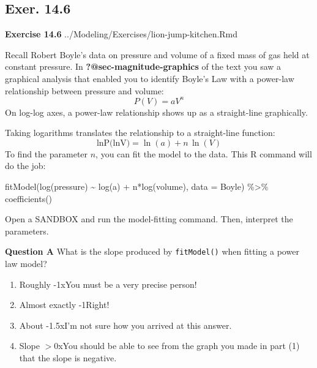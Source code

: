 \documentclass[
  letterpaper,
  DIV=11,
  numbers=noendperiod,
  oneside]{article}
\newenvironment{Shaded}{\begin{snugshade}}{\end{snugshade}}
\newcommand{\AttributeTok}[1]{\textcolor[rgb]{0.40,0.45,0.13}{#1}}
\newcommand{\FunctionTok}[1]{\textcolor[rgb]{0.28,0.35,0.67}{#1}}
\newcommand{\NormalTok}[1]{\textcolor[rgb]{0.00,0.23,0.31}{#1}}
\newcommand{\SpecialCharTok}[1]{\textcolor[rgb]{0.37,0.37,0.37}{#1}}
\providecommand{\tightlist}{%
  \setlength{\itemsep}{0pt}\setlength{\parskip}{0pt}}\usepackage{longtable,booktabs,array}
\begin{document}
\begin{multicols}{2}
\hypertarget{exer.-14.6}{%
\section*{Exer. 14.6}\label{exer.-14.6}}

\textbf{Exercise 14.6} ../Modeling/Exercises/lion-jump-kitchen.Rmd

Recall Robert Boyle's data on pressure and volume of a fixed mass of gas
held at constant pressure. In \textbf{?@sec-magnitude-graphics} of the
text you saw a graphical analysis that enabled you to identify Boyle's
Law with a power-law relationship between pressure and volume:
\[P(V) = a V^n\] On log-log axes, a power-law relationship shows up as a
straight-line graphically.

Taking logarithms translates the relationship to a straight-line
function:\[\text{lnP(lnV)} = \ln(a) + n\,  \ln(V)\] To find the
parameter \(n\), you can fit the model to the data. This R command will
do the job:

\begin{Shaded}
\begin{Highlighting}[]
\FunctionTok{fitModel}\NormalTok{(}\FunctionTok{log}\NormalTok{(pressure) }\SpecialCharTok{\textasciitilde{}} \FunctionTok{log}\NormalTok{(a) }\SpecialCharTok{+}\NormalTok{ n}\SpecialCharTok{*}\FunctionTok{log}\NormalTok{(volume), }\AttributeTok{data =}\NormalTok{ Boyle) }\SpecialCharTok{\%\textgreater{}\%}
  \FunctionTok{coefficients}\NormalTok{()}
\end{Highlighting}
\end{Shaded}

Open a SANDBOX and run the model-fitting command. Then, interpret the
parameters.

\textbf{Question A} What is the slope produced by \texttt{fitModel()}
when fitting a power law model?

\begin{enumerate}
\def\labelenumi{\roman{enumi}.}
\tightlist
\item
  {Roughly -1{xYou must be a very precise person!}}\\
\item
  {Almost exactly -1{Right!~}}\\
\item
  {About -1.5{xI'm not sure how you arrived at this answer.}}\\
\item
  {Slope \(> 0\){xYou should be able to see from the graph you made in
  part (1) that the slope is negative.}}
\end{enumerate}


\end{multicols}
\end{document}
